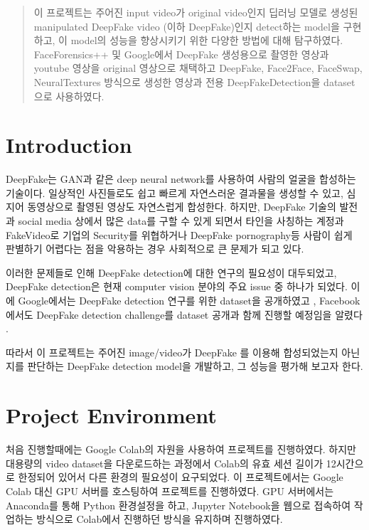 \documentclass{article}
\begin{document}
	\begin{abstract}
		이 프로젝트는 주어진 input video가 original video인지 딥러닝 모델로 생성된 manipulated DeepFake video (이하 DeepFake)인지 detect하는 model을 구현하고, 이 model의 성능을 향상시키기 위한 다양한 방법에 대해 탐구하였다. FaceForensics++ \cite{roessler2019faceforensicspp} 및 Google에서 DeepFake 생성용으로 촬영한 영상과 youtube 영상을 original 영상으로 채택하고 DeepFake, Face2Face, FaceSwap, NeuralTextures 방식으로 생성한 영상과 전용 DeepFakeDetection을 dataset으로 사용하였다.
	\end{abstract}
	
	\section{Introduction}
	DeepFake는 GAN과 같은 deep neural network를 사용하여 사람의 얼굴을 합성하는 기술이다. 일상적인 사진들로도 쉽고 빠르게 자연스러운 결과물을 생성할 수 있고, 심지어 동영상으로 촬영된 영상도 자연스럽게 합성한다. 하지만, DeepFake 기술의 발전과 social media 상에서 많은 data를 구할 수 있게 되면서 타인을 사칭하는 계정과 FakeVideo로 기업의 Security를 위협하거나 DeepFake pornography등 사람이 쉽게 판별하기 어렵다는 점을 악용하는 경우 사회적으로 큰 문제가 되고 있다.
	
	이러한 문제들로 인해 DeepFake detection에 대한 연구의 필요성이 대두되었고, DeepFake detection은 현재 computer vision 분야의 주요 issue 중 하나가 되었다. 이에 Google에서는 DeepFake detection 연구를 위한 dataset을 공개하였고 \cite{googleblog}, Facebook에서도 DeepFake detection challenge를 dataset 공개과 함께 진행할 예정임을 알렸다 \cite{facebookblog}.
	
	따라서 이 프로젝트는 주어진 image/video가 DeepFake 를 이용해 합성되었는지 아닌지를 판단하는 DeepFake detection model을 개발하고, 그 성능을 평가해 보고자 한다.
	
	\section{Project Environment}
	
	처음 진행할때에는 Google Colab의 자원을 사용하여 프로젝트를 진행하였다. 하지만 대용량의 video dataset을 다운로드하는 과정에서 Colab의 유효 세션 길이가 12시간으로 한정되어 있어서 다른 환경의 필요성이 요구되었다. 이 프로젝트에서는 Google Colab 대신 GPU 서버를 호스팅하여 프로젝트를 진행하였다. GPU 서버에서는 Anaconda를 통해 Python 환경설정을 하고, Jupyter Notebook을 웹으로 접속하여 작업하는 방식으로 Colab에서 진행하던 방식을 유지하며 진행하였다.
	
\end{document}
